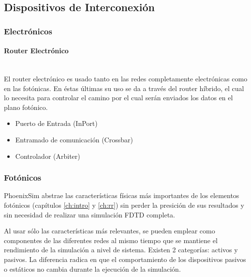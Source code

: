 \subsection{Dispositivos de Interconexión}
\subsubsection{Electrónicos}

\paragraph{Router Electrónico}~\\
El router electrónico es usado tanto en las redes completamente electrónicas como en las fotónicas. En éstas últimas su uso se da a través del router híbrido, el cual lo necesita para controlar el camino por el cual serán enviados los datos en el plano fotónico.

\begin{itemize}
\item Puerto de Entrada (InPort)
\item Entramado de comunicación (Crossbar)
\item Controlador (Arbiter)
\end{itemize} 

\subsubsection{Fotónicos}
PhoenixSim abstrae las características físicas más importantes de los elementos fotónicos (capítulos \ref{ch:intro} y \ref{ch:rr}) sin perder la presición de sus resultados y sin necesidad de realizar una simulación FDTD completa. 

Al usar sólo las características más relevantes, se pueden emplear como componentes de las diferentes redes al mismo tiempo que se mantiene el rendimiento de la simulación a nivel de sistema.
Existen 2 categorías: activos y pasivos. La diferencia radica en que el comportamiento 
de los dispositivos pasivos o estáticos no cambia durante la ejecución de la simulación.


